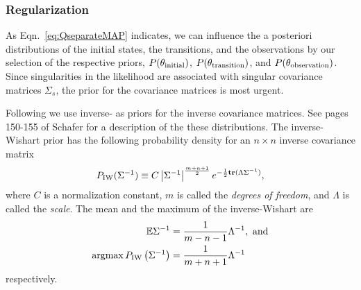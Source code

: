 \subsubsection{Regularization}

As Eqn.~\eqref{eq:QseparateMAP} indicates, we can influence the a
posteriori distributions of the initial states, the transitions, and
the observations by our selection of the respective priors,
$P(\theta_{\text{initial}})$, $P(\theta_{\text{transition}})$, and
$P(\theta_{\text{observation}})$.  Since singularities in the likelihood
are associated with singular covariance matrices $\Sigma_s$, the prior
for the covariance matrices is most urgent.

Following \cite{Gauvain94, Ormoneit95} we use inverse- as priors for the inverse covariance matrices.  See
pages 150-155 of Schafer \cite{Schafer97} for a description of the
these distributions.  The inverse-Wishart prior has the following
probability density for an $n\times n$ inverse covariance matrix
\begin{equation*}
  P_{\text{IW}}(\Sigma^{-1}) \equiv C \left| \Sigma^{-1}
                    \right|^{\frac{m+n+1}{2}}
                    e^{-\frac{1}{2} {\bf tr}(\Lambda \Sigma^{-1})},
\end{equation*}
where $C$ is a normalization constant, $m$ is called the \emph{degrees
  of freedom}, and $\Lambda$ is called the \emph{scale}.  The mean and
the maximum of the inverse-Wishart are
\begin{align*}
  \mathbb{E} \Sigma^{-1} &= \frac{1}{m-n-1} \Lambda^{-1}, \text{ and} \\
  \operatorname*{argmax} P_{\text{IW}} \left( \Sigma^{-1} \right) &= \frac{1}{m+n+1}
  \Lambda^{-1}
\end{align*}
respectively.

